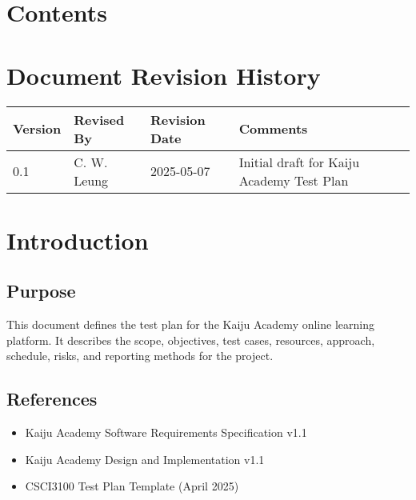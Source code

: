 \documentclass[a4paper,11pt]{scrartcl}
\begin{document}
\section*{Contents}
\tableofcontents
\clearpage

\section*{Document Revision History}
\begin{center}
\begin{tabularx}{\textwidth}{l l l X}
\toprule
Version & Revised By & Revision Date & Comments \\
\midrule
0.1 & C. W. Leung & 2025-05-07 & Initial draft for Kaiju Academy Test Plan \\
\bottomrule
\end{tabularx}
\end{center}

\clearpage
{}


\section{Introduction}

\subsection{Purpose}
This document defines the test plan for the Kaiju Academy online learning platform. It describes the scope, objectives, test cases, resources, approach, schedule, risks, and reporting methods for the project.

\subsection{References}
\begin{itemize}[leftmargin=*]
    \item Kaiju Academy Software Requirements Specification v1.1
    \item Kaiju Academy Design and Implementation v1.1
    \item CSCI3100 Test Plan Template (April 2025)
\end{itemize}
\end{document}
